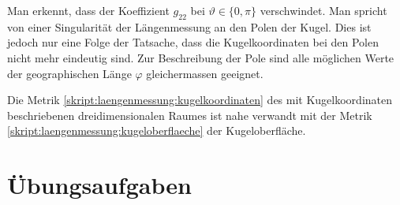 Man erkennt, dass der Koeffizient $g_{22}$ bei $\vartheta \in\{0,\pi\}$
verschwindet.
Man spricht von einer Singularität der Längenmessung an den Polen der Kugel.
Dies ist jedoch nur eine Folge der Tatsache, dass die Kugelkoordinaten
bei den Polen nicht mehr eindeutig sind.
Zur Beschreibung der Pole sind alle möglichen Werte der geographischen
Länge $\varphi$ gleichermassen geeignet.

Die Metrik 
\eqref{skript:laengenmessung:kugelkoordinaten}
des mit Kugelkoordinaten beschriebenen dreidimensionalen Raumes
ist nahe verwandt mit der Metrik
\eqref{skript:laengenmessung:kugeloberflaeche}
der Kugeloberfläche.



\section{Übungsaufgaben}

